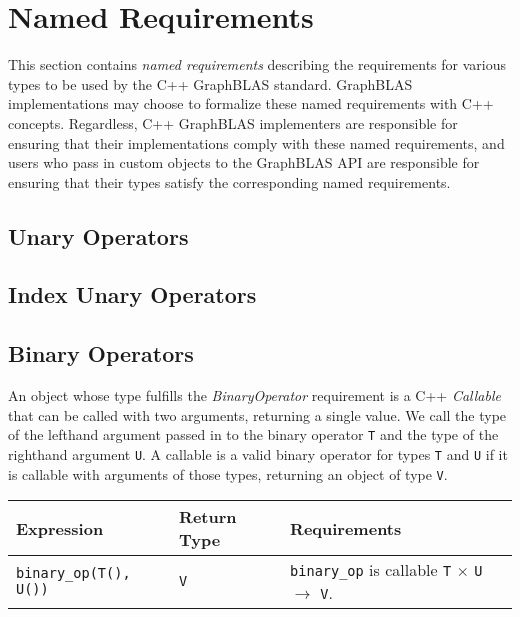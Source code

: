 \chapter{Named Requirements}
\label{Chp:NamedRequirements}

This section contains \textit{named requirements} describing the requirements for
various types to be used by the C++ GraphBLAS standard.
GraphBLAS implementations may choose to formalize these named requirements with
C++ concepts.  Regardless, C++ GraphBLAS implementers are responsible for
ensuring that their implementations comply with these named requirements, and
users who pass in custom objects to the GraphBLAS API are responsible for
ensuring that their types satisfy the corresponding named requirements.

\section{Unary Operators}

\section{Index Unary Operators}

\section{Binary Operators}
An object whose type fulfills the \textit{BinaryOperator} requirement is a C++
\textit{Callable} that can be called with two arguments, returning a single
value.  We call the type of the lefthand argument passed in to the binary operator
\texttt{T} and the type of the righthand argument \texttt{U}.  A callable is a
valid binary operator for types \texttt{T} and \texttt{U} if it is callable with
arguments of those types, returning an object of type \texttt{V}.

\begin{tabularx}{\textwidth}{l l X}
\textbf{Expression} & \textbf{Return Type} & \textbf{Requirements}\\
\hline
\texttt{binary\_op(T(), U())} & \texttt{V} & \texttt{binary\_op} is callable \texttt{T} $\times$ \texttt{U} $\rightarrow$ \texttt{V}.\\
\end{tabularx}

